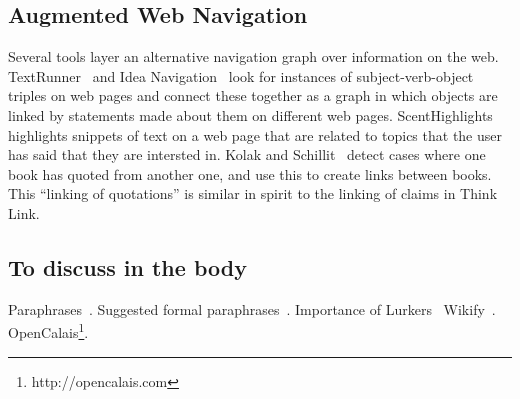 \documentclass{chi2009}
\begin{document}
\subsection{Augmented Web Navigation}

Several tools layer an alternative navigation graph over information on the web. TextRunner~\cite{Etzioni2008} and Idea Navigation~\cite{Etzioni2008} look for instances of subject-verb-object triples on web pages and connect these together as a graph in which objects are linked by statements made about them on different web pages. ScentHighlights~\cite{Chi2005a} highlights snippets of text on a web page that are related to topics that the user has said that they are intersted in. Kolak and Schillit~\cite{Kolak2008} detect cases where one book has quoted from another one, and use this to create links between books. This ``linking of quotations'' is similar in spirit to the linking of claims in Think Link. 

% 
% 

% 

% 

\subsection{To discuss in the body}

Paraphrases~\cite{Chklovski2005}. Suggested formal paraphrases~\cite{Blythe2004}.
Importance of Lurkers~\cite{Takahashi2003}
Wikify~\cite{Mihalcea2007}. OpenCalais\footnote{http://opencalais.com}.

%
\end{document}

